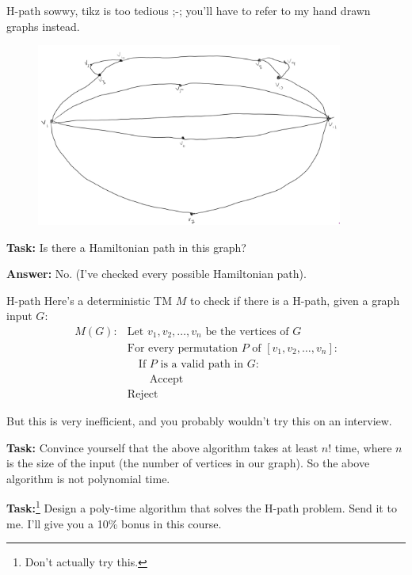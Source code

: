 \documentclass{beamer}
\begin{document}
\begin{frame}{H-path}
{\tiny sowwy, tikz is too tedious ;-; you'll have to refer to my hand drawn graphs instead.}

\begin{figure}[h]
\centering
\includegraphics[height=6cm]{img/graph_helo.png}
\end{figure}

\textbf{Task:} Is there a Hamiltonian path in this graph?

\pause

\textbf{Answer:} No. (I've checked every possible Hamiltonian path).

\end{frame}

\begin{frame}{H-path}
Here's a deterministic TM $M$ to check if there is a H-path, given a graph input $G$:
\begin{align*}
M(G): &\text{Let $v_1, v_2, \ldots, v_n$ be the vertices of $G$}\\
&\text{For every permutation $P$ of $[v_1, v_2, \ldots, v_n]$:}\\
&\quad \text{If $P$ is a valid path in $G$:}\\
&\quad \quad \text{Accept}\\
&\text{Reject}
\end{align*}

But this is very inefficient, and you probably wouldn't try this on an interview.

\textbf{Task:} Convince yourself that the above algorithm takes at least $n!$ time, where $n$ is the size of the input (the number of vertices in our graph). So the above algorithm is not polynomial time.

\textbf{Task:}\footnote{Don't actually try this.} Design a poly-time algorithm that solves the H-path problem. Send it to me. I'll give you a 10\% bonus in this course.

\end{frame}
\end{document}
